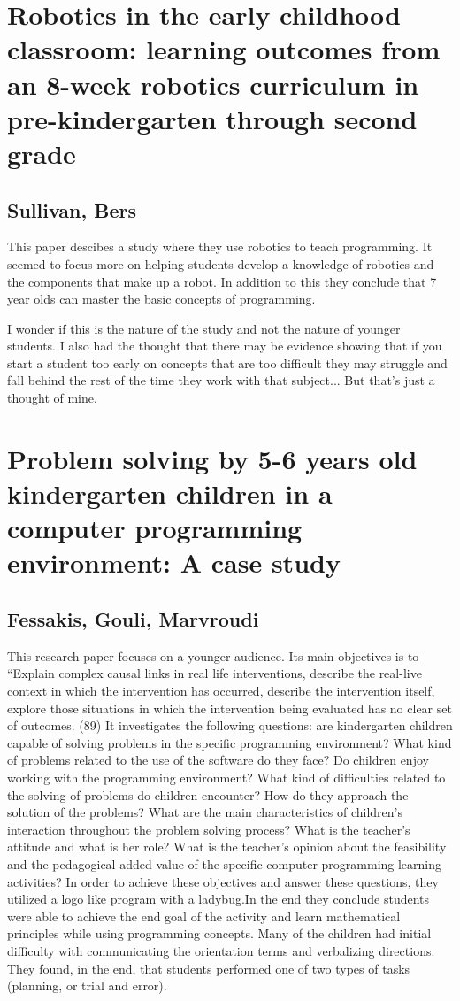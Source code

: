 \documentclass[12pt]{extarticle}
\begin{document}
{\section*{Robotics in the early childhood classroom: learning outcomes from an 8-week robotics curriculum in pre-kindergarten through second grade}
\subsection*{Sullivan, Bers}
This paper descibes a study where they use robotics to teach programming. It seemed to focus more on helping students develop a knowledge of robotics and the components that make up a robot. In addition to this they conclude that 7 year olds can master the basic concepts of programming. 

I wonder if this is the nature of the study and not the nature of younger students. I also had the thought that there may be evidence showing that if you start a student too early on concepts that are too difficult they may struggle and fall behind the rest of the time they work with that subject... But that's just a thought of mine.


\section*{Problem solving by 5-6 years old kindergarten children in a computer programming environment: A case study}
\subsection*{Fessakis, Gouli, Marvroudi}
This research paper focuses on a younger audience. Its main objectives is to “Explain complex causal links in real life interventions, describe the real-live context in which the intervention has occurred, describe the intervention itself, explore those situations in which the intervention being evaluated has no clear set of outcomes. (89)
It investigates the following questions: are kindergarten children capable of solving problems in the specific programming environment? What kind of problems related to the use of the software do they face? Do children enjoy working with the programming environment? What kind of difficulties related to the solving of problems do children encounter?  How do they approach the solution of the problems? What are the main characteristics of children’s interaction throughout the problem solving process? What is the teacher’s attitude and what is her role? What is the teacher’s opinion about the feasibility and the pedagogical added value of the specific computer programming learning activities? 
In order to achieve these objectives and answer these questions, they utilized a logo like program with a ladybug.In the end they conclude students were able to achieve the end goal of the activity and learn mathematical principles while using programming concepts. Many of the children had initial difficulty with communicating the orientation terms and verbalizing directions. They found, in the end, that students performed one of two types of tasks (planning, or trial and error).

}
\end{document}
